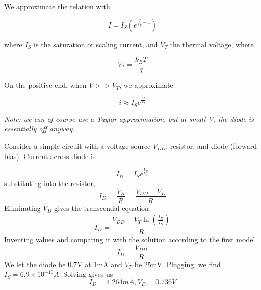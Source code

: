 \documentclass[12pt]{article}
\begin{document}
We approximate the relation with

\begin{equation}
    I = I_S \left(e^{\frac{V}{V_T} - 1}\right)
\end{equation}

where $I_S$ is the saturation or scaling current, and $V_T$ the thermal voltage, where

\begin{equation}
    V_T = \frac{k_BT}{q}
\end{equation}

On the positive end, when $V >> V_T$, we approximate

\begin{equation}
    i \approx I_Se^{\frac{V}{V_T}}
\end{equation}

\textit{Note: we can of course use a Taylor approximation, but at small V, the diode is essentially off anyway.}

\begin{ex}
    Consider a simple circuit with a voltage source $V_{DD}$, resistor, and diode (forward bias). Current across diode is

    $$I_D = I_Se^{\frac{V_D}{V_T}}$$
    substituting into the resistor,
    $$I_D = \frac{V_R}{R} = \frac{V_{DD}-V_D}{R}$$
    Eliminating $V_D$ gives the transcendal equation
    $$I_D = \frac{V_{DD} - V_T\ln\left(\frac{I_D}{I_S}\right)}{R}$$
    Inventing values and comparing it with the solution according to the first model
    $$I_D = \frac{V_{DD}}{R}$$
    We let the diode be 0.7V at 1mA and $V_T$ be 25mV. Plugging, we find $I_S = 6.9 \times 10^{-16}\unit{A}$. Solving gives us
    $$I_D = 4.264 \unit{mA}, V_D = 0.736\unit{V}$$
\end{ex}
\end{document}
